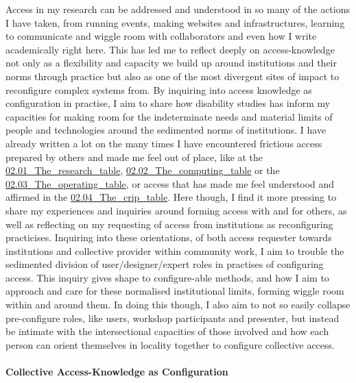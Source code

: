 Access in my research can be addressed and understood in so many of the
actions I have taken, from running events, making websites and
infrastructures, learning to communicate and wiggle room with
collaborators and even how I write academically right here. This has led
me to reflect deeply on access-knowledge not only as a flexibility and
capacity we build up around institutions and their norms through
practice but also as one of the most divergent sites of impact to
reconfigure complex systems from. By inquiring into access knowledge as
configuration in practise, I aim to share how disability studies has
inform my capacities for making room for the indeterminate needs and
material limits of people and technologies around the sedimented norms
of institutions. I have already written a lot on the many times I have
encountered frictious access prepared by others and made me feel out of
place, like at the
\href{../../02_Crip-Tic_of_Vignettes/sections/02.01_The_research_table.md}{02.01\_The\_research\_table},
\href{../../02_Crip-Tic_of_Vignettes/sections/02.02_The_computing_table.md}{02.02\_The\_computing\_table}
or the
\href{../../02_Crip-Tic_of_Vignettes/sections/02.03_The_operating_table.md}{02.03\_The\_operating\_table},
or access that has made me feel understood and affirmed in the
\href{../../02_Crip-Tic_of_Vignettes/sections/02.04_The_crip_table.md}{02.04\_The\_crip\_table}.
Here though, I find it more pressing to share my experiences and
inquiries around forming access with and for others, as well as
reflecting on my requesting of access from institutions as reconfiguring
practicises. Inquiring into these orientations, of both access requester
towards institutions and collective provider within community work, I
aim to trouble the sedimented division of user/designer/expert roles in
practises of configuring access. This inquiry gives shape to
configure-able methods, and how I aim to approach and care for these
normalised institutional limits, forming wiggle room within and around
them. In doing this though, I also aim to not so easily collapse
pre-configure roles, like users, workshop participants and presenter,
but instead be intimate with the intersectional capacities of those
involved and how each person can orient themselves in locality together
to configure collective access.

\hypertarget{collective-access-knowledge-as-configuration}{%
\paragraph[Collective Access-Knowledge as
Configuration]{\texorpdfstring{\protect\hypertarget{anchor}{}{}Collective
Access-Knowledge as
Configuration}{Collective Access-Knowledge as Configuration}}\label{collective-access-knowledge-as-configuration}}

